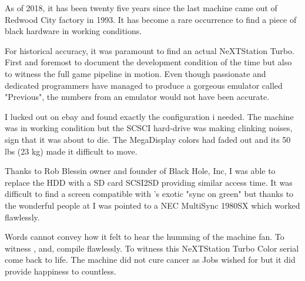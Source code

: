  As of 2018, it has been twenty five years since the last machine came out of \NeXT Redwood City factory in 1993. It has become a rare occurrence to find a piece of black hardware in working conditions.\\
 \par
 For historical accuracy, it was paramount to find an actual NeXTStation Turbo. First and foremost to document the development condition of the time but also to witness the full game pipeline in motion. Even though passionate and dedicated programmers have managed to produce a gorgeous emulator called "Previous", the numbers from an emulator would  not have been accurate.\\
 \par
  I lucked out on ebay and found exactly the configuration i needed. The machine was in working condition but the SCSCI hard-drive was making clinking noises, sign that it was about to die. The MegaDisplay colors had faded out and its 50 lbs (23 kg) made it difficult to move.\\
  \par
  Thanks to Rob Blessin owner and founder of Black Hole, Inc, I was able to replace the HDD with a SD card SCSI2SD providing similar access time. It was difficult to find a screen compatible with \NeXT's exotic "sync on green" but thanks to the wonderful people at  I was pointed to a NEC MultiSync 1980SX which worked flawlessly.\\
  \par
  Words cannot convey how it felt to hear the humming of the machine fan. To witness ,  and,  compile flawlessly. To witness this NeXTStation Turbo Color serial  come back to life. The machine did not cure cancer as Jobs wished for but it did provide happiness to countless.

\pagebreak



